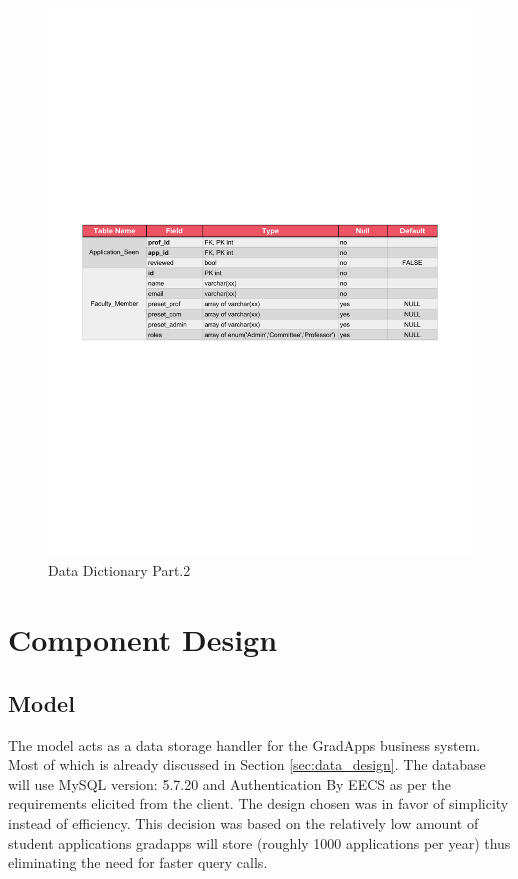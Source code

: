 \documentclass[fontsize=12pt,paper=letter,twoside]{scrartcl}
\begin{document}
\begin{figure}[!htb]
\begin{center}
\includegraphics[width=\textwidth]{images/data_dictionary2.pdf}
\end{center}
\caption{Data Dictionary Part.2}
\label{fig:dd2}
\end{figure}


\clearpage
\newpage
\section{Component Design}

\subsection{Model}

The model acts as a data storage handler for the GradApps business system. Most of which is already discussed in Section \ref{sec:data_design}. The database will use MySQL version: 5.7.20 and Authentication By EECS as per the requirements elicited from the client. The design chosen was in favor of simplicity instead of efficiency. This decision was based on the relatively low amount of student applications gradapps will store (roughly 1000 applications per year) thus eliminating the need for faster query calls.
\end{document}
